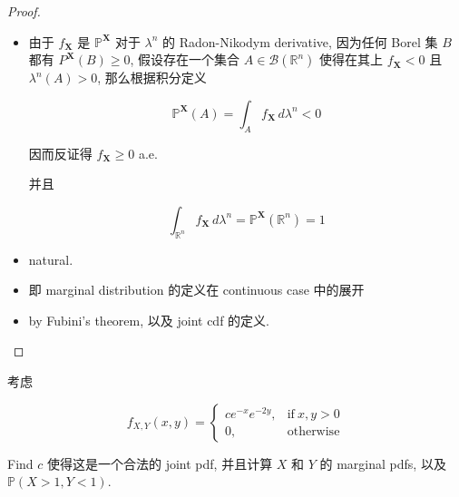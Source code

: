 \documentclass{qlnotes-export}
\begin{document}
\begin{proof}

\begin{itemize}
\item
  由于 \(f_{\mathbf{X}}\) 是 \({\mathbb{P}}^{\mathbf{X}}\) 对于 \(\lambda^{n}\) 的 Radon-Nikodym derivative, 因为任何 Borel 集 \(B\) 都有 \(P^{\mathbf{X}}(B) \geq 0\), 假设存在一个集合 \(A \in \mathcal{B}({\mathbb{R}}^{n})\) 使得在其上 \(f_{\mathbf{X}} < 0\) 且 \(\lambda^{n}(A) > 0\), 那么根据积分定义

  \[{\mathbb{P}}^{\mathbf{X}}(A) = \int_{A}f_{\mathbf{X}}\, d\lambda^{n} < 0\]

  因而反证得 \(f_{\mathbf{X}} \geq 0\) a.e.

  并且

  \[\int_{{\mathbb{R}}^{n}}f_{\mathbf{X}}\, d\lambda^{n} = {\mathbb{P}}^{\mathbf{X}}({\mathbb{R}}^{n}) = 1\]
\item
  natural.
\item
  即 marginal distribution 的定义在 continuous case 中的展开
\item
  by Fubini's theorem, 以及 joint cdf 的定义.
\end{itemize}

\end{proof}

\begin{example}\label{ex-03-joint-conditional-distribution-example-001}

考虑

\[f_{X,Y}(x,y) = \left\{ \begin{matrix}
{ce^{- x}e^{- 2y},} & {\text{if}\ x,y > 0} \\
{0,} & \text{otherwise}
\end{matrix} \right.\]

Find \(c\) 使得这是一个合法的 joint pdf, 并且计算 \(X\) 和 \(Y\) 的 marginal pdfs, 以及 \({\mathbb{P}}(X > 1,Y < 1)\).

\end{example}
\end{document}
